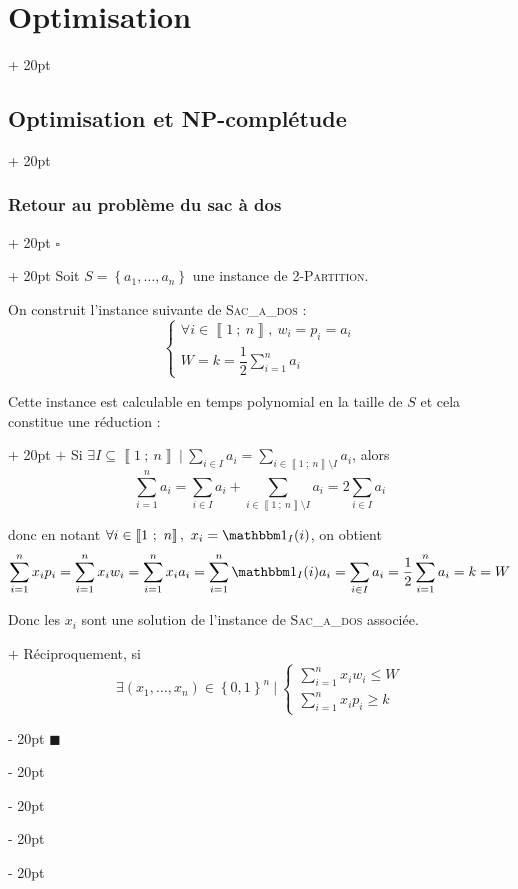\documentclass[a4paper, 12pt, twoside]{article}
\newcommand{\nset}[2]{\left\llbracket #1\ ;\ #2 \right\rrbracket}
\newcommand{\set}[1]{\left\{ #1 \right\}}
\renewcommand{\le}{\leqslant}
\renewcommand{\ge}{\geqslant}
\newcommand{\ind}[1][20pt]{\advance\leftskip + #1}
\newcommand{\deind}[1][20pt]{\advance\leftskip - #1}
\newenvironment{indt}[2][20pt]{#2 \par \ind[#1]}{\par \deind} %
\newenvironment{proof}[1][{}]{\begin{indt}{$\square$ #1}}{$\blacksquare$ \end{indt}}
\newcommand{\1}{\mathbbm 1}
\begin{document}
\begin{indt}{\section{Optimisation}}
\begin{indt}{\subsection{Optimisation et \textbf{NP}-complétude}}
\begin{indt}{\subsubsection{Retour au problème du sac à dos}}
\begin{proof}
                    Soit $S = \set{a_1, \ldots, a_n}$ une instance de 2-\textsc{Partition}.

                    On construit l'instance suivante de \textsc{Sac\_a\_dos} :
                    \[
                        \begin{cases}
                            \forall i \in \nset 1 n,\ w_i = p_i = a_i
                            \\
                            \displaystyle
                            W = k = \dfrac 1 2 \sum_{i = 1}^n a_i
                        \end{cases}
                    \]

                    \begin{indt}{Cette instance est calculable en temps polynomial en la taille de $S$ et cela constitue une réduction :}
                        $+$ Si $\exists I \subseteq \nset 1 n\ |\ \displaystyle \sum_{i \in I} a_i = \sum_{i \in \nset 1 n \setminus I} a_i$, alors
                        \[
                            \sum_{i = 1}^n a_i
                            = \sum_{i \in I} a_i + \sum_{i \in \nset 1 n \setminus I} a_i
                            = 2\sum_{i \in I} a_i
                        \]

                        donc en notant $\forall i \in \nset 1 n,\ x_i = \1_I(i)$, on obtient
                        \[
                            \sum_{i = 1}^n x_i p_i
                            = \sum_{i = 1}^n x_i w_i
                            = \sum_{i = 1}^n x_i a_i
                            = \sum_{i = 1}^n \1_I(i) a_i
                            = \sum_{i \in I} a_i
                            = \dfrac 1 2 \sum_{i = 1}^n a_i
                            = k
                            = W
                        \]

                        Donc les $x_i$ sont une solution de l'instance de \textsc{Sac\_a\_dos} associée.

                        \vspace{6pt}
                        
                        $+$ Réciproquement, si
                        \[
                            \exists (x_1, \ldots, x_n) \in \set{0, 1}^n\ |\
                            \begin{cases}
                                \displaystyle
                                \sum_{i = 1}^n x_i w_i \le W
                                \\
                                \displaystyle
                                \sum_{i = 1}^n x_i p_i \ge k
                            \end{cases}
                        \]


\end{indt}
\end{proof}
\end{indt}
\end{indt}
\end{indt}
\end{document}
